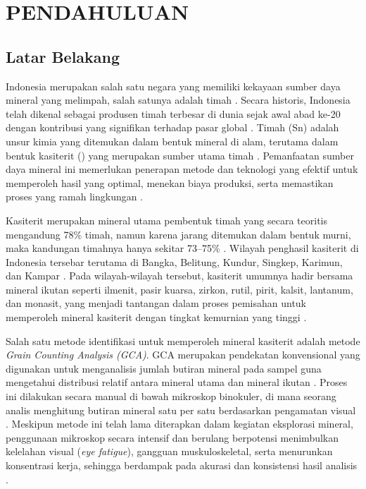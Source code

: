 \newpage

\chapter{PENDAHULUAN} \label{Bab I}

\section{Latar Belakang} \label{I.Latar Belakang}
Indonesia merupakan salah satu negara yang memiliki kekayaan sumber daya mineral yang melimpah, salah satunya adalah timah \cite{PurificationCassiterite4}. Secara historis, Indonesia telah dikenal sebagai produsen timah terbesar di dunia sejak awal abad ke-20 dengan kontribusi yang signifikan terhadap pasar global \cite{IrzonTimahIndonesia12}. Timah (Sn) adalah unsur kimia yang ditemukan dalam bentuk mineral di alam, terutama dalam bentuk kasiterit (\senyawatin) yang merupakan sumber utama timah \cite{IrzonTimahIndonesia12}. Pemanfaatan sumber daya mineral ini memerlukan penerapan metode dan teknologi yang efektif untuk memperoleh hasil yang optimal, menekan biaya produksi, serta memastikan proses yang ramah lingkungan \cite{PurificationCassiterite4}. \par

Kasiterit merupakan mineral utama pembentuk timah yang secara teoritis mengandung 78\% timah, namun karena jarang ditemukan dalam bentuk murni, maka kandungan timahnya hanya sekitar 73–75\% \cite{bookTin} \cite{PurificationCassiterite4}. Wilayah penghasil kasiterit di Indonesia tersebar terutama di Bangka, Belitung, Kundur, Singkep, Karimun, dan Kampar \cite{PurificationCassiterite4}. Pada wilayah-wilayah tersebut, kasiterit umumnya hadir bersama mineral ikutan seperti ilmenit, pasir kuarsa, zirkon, rutil, pirit, kalsit, lantanum, dan monasit, yang menjadi tantangan dalam proses pemisahan untuk memperoleh mineral kasiterit dengan tingkat kemurnian yang tinggi \cite{PurificationCassiterite4} \cite{IrzonTimahIndonesia12}. \par

Salah satu metode identifikasi untuk memperoleh mineral kasiterit adalah metode  \textit{Grain Counting Analysis (GCA)}. GCA merupakan pendekatan konvensional yang digunakan untuk menganalisis jumlah butiran mineral pada sampel guna mengetahui distribusi relatif antara mineral utama dan mineral ikutan \cite{KajianPTTimah6}. Proses ini dilakukan secara manual di bawah mikroskop binokuler, di mana seorang analis menghitung butiran mineral satu per satu berdasarkan pengamatan visual \cite{KajianPTTimah6}. Meskipun metode ini telah lama diterapkan dalam kegiatan eksplorasi mineral, penggunaan mikroskop secara intensif dan berulang berpotensi menimbulkan kelelahan visual (\textit{eye fatigue}), gangguan muskuloskeletal, serta menurunkan konsentrasi kerja, sehingga berdampak pada akurasi dan konsistensi hasil analisis \cite{VisualTrain8} \cite{ConcernAssociated7}. \par

